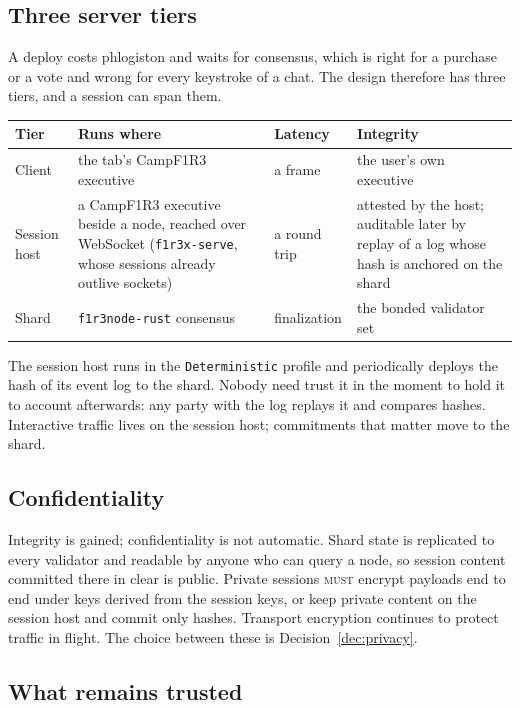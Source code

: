 \documentclass[11pt]{article}
\theoremstyle{definition}
\theoremstyle{remark}
\newcommand{\Camp}{CampF1R3}
\newcommand{\MUST}{\textsc{must}}
\newcommand{\code}[1]{\texttt{#1}}
\begin{document}
\subsection{Three server tiers}

A deploy costs phlogiston and waits for consensus, which is right for a purchase or a
vote and wrong for every keystroke of a chat. The design therefore has three tiers, and
a session can span them.

\begin{center}
\begin{tabularx}{\linewidth}{@{}p{2.6cm}p{3.8cm}p{3.1cm}X@{}}
\toprule
Tier & Runs where & Latency & Integrity\\
\midrule
Client & the tab's \Camp{} executive & a frame & the user's own executive\\
Session host & a \Camp{} executive beside a node, reached over WebSocket (\code{f1r3x-serve}, whose sessions already outlive sockets) & a round trip & attested by the host; auditable later by replay of a log whose hash is anchored on the shard\\
Shard & \code{f1r3node-rust} consensus & finalization & the bonded validator set\\
\bottomrule
\end{tabularx}
\end{center}

\noindent
The session host runs in the \code{Deterministic} profile and periodically deploys the
hash of its event log to the shard. Nobody need trust it in the moment to hold it to
account afterwards: any party with the log replays it and compares hashes. Interactive
traffic lives on the session host; commitments that matter move to the shard.

\subsection{Confidentiality}

Integrity is gained; confidentiality is not automatic. Shard state is replicated to
every validator and readable by anyone who can query a node, so session content
committed there in clear is public. Private sessions \MUST{} encrypt payloads end to
end under keys derived from the session keys, or keep private content on the session
host and commit only hashes. Transport encryption continues to protect traffic in
flight. The choice between these is Decision~\ref{dec:privacy}.

\subsection{What remains trusted}
\end{document}

